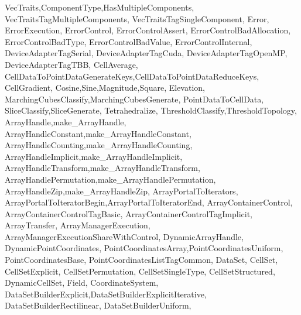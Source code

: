 {{                   VecTraits,ComponentType,HasMultipleComponents,
                   VecTraitsTagMultipleComponents,
                   VecTraitsTagSingleComponent,
                   Error, ErrorExecution, ErrorControl,
                   ErrorControlAssert,
                   ErrorControlBadAllocation,
                   ErrorControlBadType,
                   ErrorControlBadValue,
                   ErrorControlInternal,
                   DeviceAdapterTagSerial,
                   DeviceAdapterTagCuda,
                   DeviceAdapterTagOpenMP,
                   DeviceAdapterTagTBB,
                   CellAverage,
                   CellDataToPointDataGenerateKeys,CellDataToPointDataReduceKeys,
                   CellGradient,
                   Cosine,Sine,Magnitude,Square,
                   Elevation,
                   MarchingCubesClassify,MarchingCubesGenerate,
                   PointDataToCellData,
                   SliceClassify,SliceGenerate,
                   Tetrahedralize,
                   ThresholdClassify,ThresholdTopology,
                   ArrayHandle,make_ArrayHandle,
                   ArrayHandleConstant,make_ArrayHandleConstant,
                   ArrayHandleCounting,make_ArrayHandleCounting,
                   ArrayHandleImplicit,make_ArrayHandleImplicit,
                   ArrayHandleTransform,make_ArrayHandleTransform,
                   ArrayHandlePermutation,make_ArrayHandlePermutation,
                   ArrayHandleZip,make_ArrayHandleZip,
                   ArrayPortalToIterators,
                   ArrayPortalToIteratorBegin,ArrayPortalToIteratorEnd,
                   ArrayContainerControl,
                   ArrayContainerControlTagBasic,
                   ArrayContainerControlTagImplicit,
                   ArrayTransfer,
                   ArrayManagerExecution,
                   ArrayManagerExecutionShareWithControl,
                   DynamicArrayHandle,
                   DynamicPointCoordinates,
                   PointCoordinatesArray,PointCoordinatesUniform,
                   PointCoordinatesBase,
                   PointCoordinatesListTagCommon,
                   DataSet,
                   CellSet,
                   CellSetExplicit,
                   CellSetPermutation,
                   CellSetSingleType,
                   CellSetStructured,
                   DynamicCellSet,
                   Field,
                   CoordinateSystem,
                   DataSetBuilderExplicit,DataSetBuilderExplicitIterative,
                   DataSetBuilderRectilinear,
                   DataSetBuilderUniform,
}}
